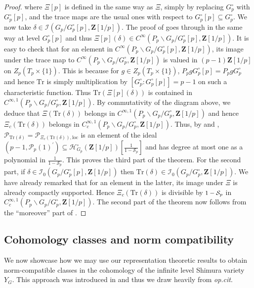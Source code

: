 \documentclass{amsart}%
\theoremstyle{plain}
\newcommand\scalemath[2]{\scalebox{#1}{\mbox{\ensuremath{\displaystyle #2}}}}
\theoremstyle{plain}
\theoremstyle{remark}
\begin{document}
\begin{proof}
where $\Xi[p]$ is defined in the same way as $\Xi$, simply by replacing $G_p^\circ$ with $G_p^\circ[p]$, and the trace maps are the usual ones with respect to $G_p^\circ[p]\subseteq G_p^\circ$. We now take $\delta\in\mathcal{I}(G_p/G_p^\circ[p],\mathbf{Z}[1/p])$. The proof of  goes through in the same way at level $G_p^\circ[p]$ and thus $\Xi[p](\delta)\in C^\infty(P_p\backslash G_p/G_p^\circ[p],\mathbf{Z}[1/p])$. It is easy to check that for an element in $C^\infty(P_p\backslash G_p/G_p^\circ[p],\mathbf{Z}[1/p])$, its image under the trace map to $C^\infty(P_p\backslash G_p/G_p^\circ,\mathbf{Z}[1/p])$ is valued in $(p-1)\mathbf{Z}[1/p]$ on $Z_p(T_p\times \{1\})$. This is because for $g\in Z_p(T_p\times \{1\})$, $P_pgG_p^\circ[p]=P_pgG_p^\circ$ and hence $\mathrm{Tr}$ is simply multiplication by $[G_p^\circ:G_p^\circ[p]]=p-1$ on such a characteristic function. Thus $\mathrm{Tr}(\Xi[p](\delta))$ is contained in $C^{\infty,1}(P_p\backslash G_p/G_p^\circ,\mathbf{Z}[1/p])$. By commutativity of the diagram above, we deduce that $\Xi(\mathrm{Tr}(\delta))$ belongs in $ C^{\infty,1}(P_p\backslash G_p/G_p^\circ,\mathbf{Z}[1/p])$ and hence $\Xi_c(\mathrm{Tr}(\delta))$ belongs in $C_c^{\infty,1}(P_p\backslash G_p/G_p^\circ,\mathbf{Z}[1/p])$. Thus, by  and , $\mathcal{P}_{\mathrm{Tr}(\delta)}=\mathcal{P}_{\Xi_c(\mathrm{Tr}(\delta)),\mathrm{loc}}$ is an element of the ideal $\left(p-1,\mathcal{P}_p(1)^{'}\right)\subseteq\mathcal{H}_{G_p}^\circ(\mathbf{Z}[1/p])[\frac{1}{1-\mathcal{S}_p}]$ and has degree at most one as a polynomial in $\frac{1}{1-\mathcal{S}_p}.$ This proves the third part of the theorem. For the second part, if $\delta\in\mathcal{I}_0(G_p/G_p^\circ[p],\mathbf{Z}[1/p])$ then $\mathrm{Tr}(\delta)\in\mathcal{I}_0(G_p/G_p^\circ,\mathbf{Z}[1/p]) $. We have already remarked that for an element in the latter, its image under $\Xi$ is already compactly supported. Hence $\Xi_c(\mathrm{Tr}(\delta))$ is divisible by $\scalemath{0.9}{1-\mathcal{S}_p}$ in $C_c^{\infty,1}(P_p\backslash G_p/G_p^\circ,\mathbf{Z}[1/p])$. The second part of the theorem now follows from the ``moreover'' part of .
    \end{proof}
\subsection{Cohomology classes and norm compatibility} We now  showcase how we may use our representation theoretic results to obtain norm-compatible classes in the cohomology of the infinite level Shimura variety $Y_G$. This approach was introduced in \cite{Loeffler_2021} and thus we draw heavily from \textit{op.cit}. 
\end{document}
